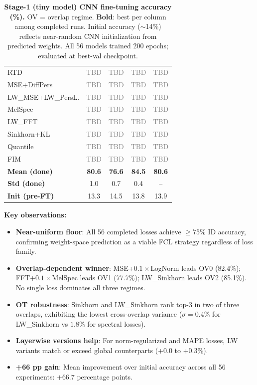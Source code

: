 \begin{table}[t]
\begin{tabular}{lcccc}
RTD           & \textcolor{gray}{TBD} & \textcolor{gray}{TBD} & \textcolor{gray}{TBD} & \textcolor{gray}{TBD} \\
MSE+DiffPers  & \textcolor{gray}{TBD} & \textcolor{gray}{TBD} & \textcolor{gray}{TBD} & \textcolor{gray}{TBD} \\
LW\_MSE+LW\_PersL. & \textcolor{gray}{TBD} & \textcolor{gray}{TBD} & \textcolor{gray}{TBD} & \textcolor{gray}{TBD} \\
MelSpec       & \textcolor{gray}{TBD} & \textcolor{gray}{TBD} & \textcolor{gray}{TBD} & \textcolor{gray}{TBD} \\
LW\_FFT       & \textcolor{gray}{TBD} & \textcolor{gray}{TBD} & \textcolor{gray}{TBD} & \textcolor{gray}{TBD} \\
Sinkhorn+KL   & \textcolor{gray}{TBD} & \textcolor{gray}{TBD} & \textcolor{gray}{TBD} & \textcolor{gray}{TBD} \\
Quantile      & \textcolor{gray}{TBD} & \textcolor{gray}{TBD} & \textcolor{gray}{TBD} & \textcolor{gray}{TBD} \\
FIM           & \textcolor{gray}{TBD} & \textcolor{gray}{TBD} & \textcolor{gray}{TBD} & \textcolor{gray}{TBD} \\
\hline
\textbf{Mean (done)} & \textbf{80.6} & \textbf{76.6} & \textbf{84.5} & \textbf{80.6} \\
\textbf{Std (done)}  & 1.0  & 0.7  & 0.4  & -- \\
\textbf{Init (pre-FT)} & 13.3 & 14.5 & 13.8 & 13.9 \\
\hline
\end{tabular}
\caption{\textbf{Stage-1 (tiny model) CNN fine-tuning accuracy (\%).} OV = overlap regime. \textbf{Bold}: best per column among completed runs. Initial accuracy ($\sim$14\%) reflects near-random CNN initialization from predicted weights. All 56 models trained 200 epochs; evaluated at best-val checkpoint.}
\label{tab:cnn_main}
\end{table}

\textbf{Key observations:}
\begin{itemize}
    \item \textbf{Near-uniform floor}: All 56 completed losses achieve $\geq$75\% ID accuracy, confirming weight-space prediction as a viable FCL strategy regardless of loss family.
    \item \textbf{Overlap-dependent winner}: MSE+$0.1\times$LogNorm leads OV0 (82.4\%); FFT+$0.1\times$MelSpec leads OV1 (77.7\%); LW\_Sinkhorn leads OV2 (85.1\%). No single loss dominates all three regimes.
    \item \textbf{OT robustness}: Sinkhorn and LW\_Sinkhorn rank top-3 in two of three overlaps, exhibiting the lowest cross-overlap variance ($\sigma = 0.4\%$ for LW\_Sinkhorn vs $1.8\%$ for spectral losses).
    \item \textbf{Layerwise versions help}: For norm-regularized and MAPE losses, LW variants match or exceed global counterparts (+0.0 to +0.3\%).
    \item \textbf{+66 pp gain}: Mean improvement over initial accuracy across all 56 experiments: $+66.7$ percentage points.
\end{itemize}

